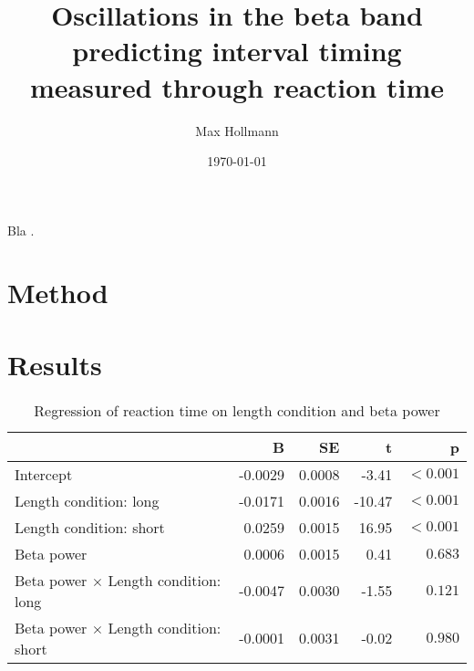 \documentclass[man]{apa6} %
\title{Oscillations in the beta band predicting interval timing measured through reaction time}
\author{Max Hollmann}
\affiliation{University of Groningen}
\date{\today}
\begin{document}
\maketitle

%





Bla \cite{tzagarakis_beta-band_2010}.

\section{Method}
\section{Results}

\begin{table}[ht]
  \caption{Regression of reaction time on length condition and beta power}
  \centering
  \begin{tabular}{lrrrr}
    \toprule
                                                  & B        & SE         & t       & p         \\
    \midrule
    Intercept                                     & -0.0029  & 0.0008     & -3.41   & $< 0.001$ \\
    Length condition: long                        & -0.0171  & 0.0016     & -10.47  & $< 0.001$ \\
    Length condition: short                       & 0.0259   & 0.0015     & 16.95   & $< 0.001$ \\
    Beta power                                    & 0.0006   & 0.0015     & 0.41    & $0.683$   \\
    Beta power $\times$ Length condition: long    & -0.0047  & 0.0030     & -1.55   & $0.121$   \\
    Beta power $\times$ Length condition: short   & -0.0001  & 0.0031     & -0.02   & $0.980$   \\
    \bottomrule
  \end{tabular}
\end{table}
\end{document}
